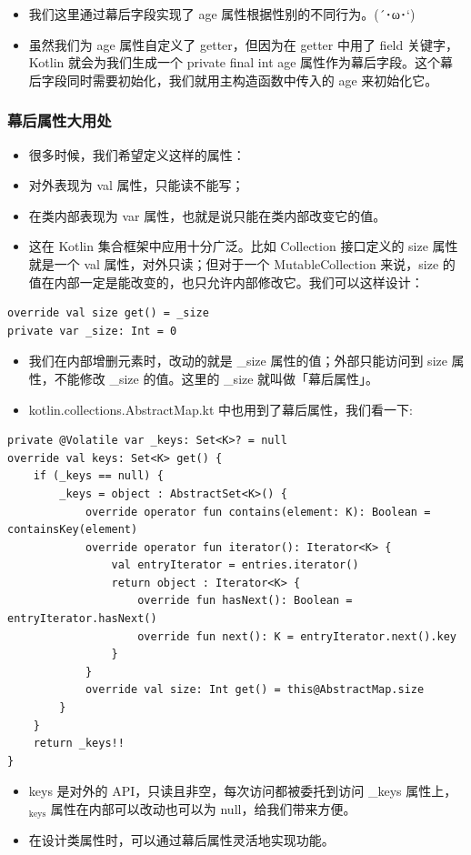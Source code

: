 \documentclass[9pt, b5paper]{article}
\begin{document}
\begin{itemize}
\item 我们这里通过幕后字段实现了 age 属性根据性别的不同行为。(´･ω･`)
\item 虽然我们为 age 属性自定义了 getter，但因为在 getter 中用了 field 关键字，Kotlin 就会为我们生成一个 private final int age 属性作为幕后字段。这个幕后字段同时需要初始化，我们就用主构造函数中传入的 age 来初始化它。
\end{itemize}
\subsubsection{幕后属性大用处}
\label{sec-7-5-2}
\begin{itemize}
\item 很多时候，我们希望定义这样的属性：
\item 对外表现为 val 属性，只能读不能写；
\item 在类内部表现为 var 属性，也就是说只能在类内部改变它的值。
\item 这在 Kotlin 集合框架中应用十分广泛。比如 Collection 接口定义的 size 属性就是一个 val 属性，对外只读；但对于一个 MutableCollection 来说，size 的值在内部一定是能改变的，也只允许内部修改它。我们可以这样设计：
\end{itemize}
\begin{verbatim}
override val size get() = _size
private var _size: Int = 0
\end{verbatim}
\begin{itemize}
\item 我们在内部增删元素时，改动的就是 \_size 属性的值；外部只能访问到 size 属性，不能修改 \_size 的值。这里的 \_size 就叫做「幕后属性」。
\item kotlin.collections.AbstractMap.kt 中也用到了幕后属性，我们看一下:
\end{itemize}
\begin{verbatim}
private @Volatile var _keys: Set<K>? = null
override val keys: Set<K> get() {
    if (_keys == null) {
        _keys = object : AbstractSet<K>() {
            override operator fun contains(element: K): Boolean = containsKey(element)
            override operator fun iterator(): Iterator<K> {
                val entryIterator = entries.iterator()
                return object : Iterator<K> {
                    override fun hasNext(): Boolean = entryIterator.hasNext()
                    override fun next(): K = entryIterator.next().key
                }
            }
            override val size: Int get() = this@AbstractMap.size
        }
    }
    return _keys!!
}
\end{verbatim}
\begin{itemize}
\item keys 是对外的 API，只读且非空，每次访问都被委托到访问 \_keys 属性上，$_{\text{keys}}$ 属性在内部可以改动也可以为 null，给我们带来方便。
\item 在设计类属性时，可以通过幕后属性灵活地实现功能。
\end{itemize}
\end{document}

